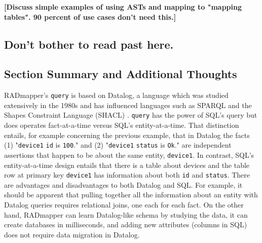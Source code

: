 \documentclass[9pt,letterpaper]{article}
\newcommand{\stt}[1]{\texttt{#1}} %
\begin{document}

\textbf{[Discuss simple examples of using ASTs and mapping to "mapping tables". 90 percent of use cases don't need this.]}

\subsection{Don't bother to read past here.}

\subsection{Section Summary and Additional Thoughts}

RADmapper's \stt{query} is based on Datalog, a language which was studied extensively in the 1980s \cite{Abiteboul1995a}
and has influenced languages such as SPARQL and the Shapes Constraint Language (SHACL) \cite{?}.
\stt{query} has the power of SQL's  query but does operates fact-at-a-time versus SQL's entity-at-a-time.
That distinction entails, for example concerning the previous example, that in Datalog the facts (1) "\stt{device1} \stt{id} is \stt{100}." and (2) "\stt{device1} \stt{status} is \stt{Ok}." are independent assertions that happen to be about the same entity, \stt{device1}.
In contrast, SQL's entity-at-a-time design entails that there is a table about devices and the table row at primary key \stt{device1} has information about both \stt{id} and \stt{status}.
There are advantages and disadvantages to both Datalog and SQL.\@
For example, it should be apparent that pulling together all the information about an entity with Datalog queries requires relational joins, one each for each fact.
On the other hand, RADmapper can learn Datalog-like schema by studying the data, it can create databases in milliseconds, and adding new attributes (columns in SQL) does not require data migration in Datalog.
\end{document}
